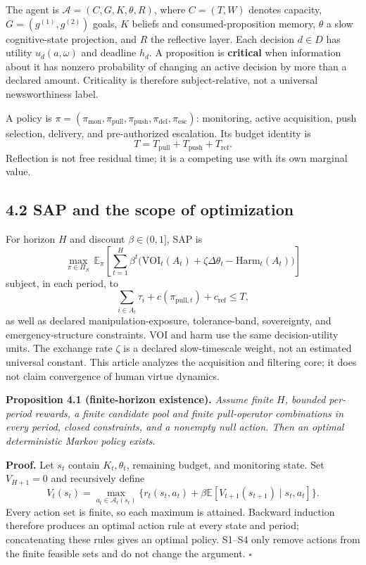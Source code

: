 \documentclass[
  11pt]{article}
\begin{document}
The agent is \(\mathcal A=(C,G,K,\theta,R)\), where \(C=(T,W)\) denotes capacity, \(G=(g^{(1)},g^{(2)})\) goals, \(K\) beliefs and consumed-proposition memory, \(\theta\) a slow cognitive-state projection, and \(R\) the reflective layer. Each decision \(d\in D\) has utility \(u_d(a,\omega)\) and deadline \(h_d\). A proposition is \textbf{critical} when information about it has nonzero probability of changing an active decision by more than a declared amount. Criticality is therefore subject-relative, not a universal newsworthiness label.

A policy is \(\pi=(\pi_{\mathrm{mon}},\pi_{\mathrm{pull}},\pi_{\mathrm{push}},\pi_{\mathrm{del}},\pi_{\mathrm{esc}})\): monitoring, active acquisition, push selection, delivery, and pre-authorized escalation. Its budget identity is \[
T=T_{\mathrm{pull}}+T_{\mathrm{push}}+T_{\mathrm{ref}}.
\] Reflection is not free residual time; it is a competing use with its own marginal value.

\subsection{4.2 SAP and the scope of optimization}\label{sap-and-the-scope-of-optimization}

For horizon \(H\) and discount \(\beta\in(0,1]\), SAP is \[
\max_{\pi\in\Pi_S}\ \mathbb E_\pi\!\left[\sum_{t=1}^{H}\beta^t
\big(\mathrm{VOI}_t(A_t)+\zeta\Delta\theta_t-\mathrm{Harm}_t(A_t)\big)\right]
\tag{1}
\] subject, in each period, to \[
\sum_{i\in A_t}\tau_i+c(\pi_{\mathrm{pull},t})+c_{\mathrm{ref}}\leq T,
\tag{2}
\] as well as declared manipulation-exposure, tolerance-band, sovereignty, and emergency-structure constraints. VOI and harm use the same decision-utility units. The exchange rate \(\zeta\) is a declared slow-timescale weight, not an estimated universal constant. This article analyzes the acquisition and filtering core; it does not claim convergence of human virtue dynamics.

\textbf{Proposition 4.1 (finite-horizon existence).} \emph{Assume finite \(H\), bounded per-period rewards, a finite candidate pool and finite pull-operator combinations in every period, closed constraints, and a nonempty null action. Then an optimal deterministic Markov policy exists.}

\textbf{Proof.} Let \(s_t\) contain \(K_t,\theta_t\), remaining budget, and monitoring state. Set \(V_{H+1}=0\) and recursively define \[
V_t(s_t)=\max_{a_t\in\mathcal A_t(s_t)}
\{r_t(s_t,a_t)+\beta\mathbb E[V_{t+1}(s_{t+1})\mid s_t,a_t]\}.
\] Every action set is finite, so each maximum is attained. Backward induction therefore produces an optimal action rule at every state and period; concatenating these rules gives an optimal policy. S1--S4 only remove actions from the finite feasible sets and do not change the argument. \(\square\)
\end{document}
